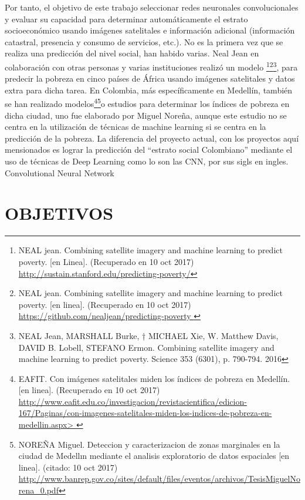     Por tanto, el objetivo de este trabajo seleccionar redes neuronales convolucionales y evaluar su capacidad para determinar automáticamente el estrato socioeconómico usando imágenes satelitales e información adicional (información catastral, presencia y consumo de servicios, etc.). No es la primera vez que se realiza una predicción del nivel social, han habido varias. Neal Jean en colaboración con otras personas y varias instituciones realizó un modelo \footnote{NEAL jean. Combining satellite imagery and machine learning to predict poverty. [en Linea]. (Recuperado en 10 oct 2017) \url{http://sustain.stanford.edu/predicting-poverty/} }\footnote{NEAL jean. Combining satellite imagery and machine learning to predict poverty. [en linea]. (Recuperado en 10 oct 2017) \url{https://github.com/nealjean/predicting-poverty }}\footnote{NEAL Jean, MARSHALL Burke, † MICHAEL Xie, W. Matthew Davis, DAVID B. Lobell, STEFANO Ermon. Combining satellite imagery and machine learning to predict poverty. Science 353 (6301), p. 790-794. 2016},  para predecir la pobreza en cinco países de África usando imágenes satelitales y datos extra para dicha tarea. En Colombia, más específicamente en Medellín, también se han realizado modelos\footnote{EAFIT. Con imágenes satelitales miden los índices de pobreza en Medellín. [en linea]. (Recuperado en 10 oct 2017) \url{http://www.eafit.edu.co/investigacion/revistacientifica/edicion-167/Paginas/con-imagenes-satelitales-miden-los-indices-de-pobreza-en-medellin.aspx> }}\footnote{NOREÑA Miguel. Deteccion y caracterizacion de zonas marginales en la ciudad de Medellın mediante el analisis exploratorio de datos espaciales [en linea]. (citado: 10 oct 2017) \url{http://www.banrep.gov.co/sites/default/files/eventos/archivos/TesisMiguelNorena_0.pdf} }o estudios para determinar los índices de pobreza en dicha ciudad, uno fue elaborado por  Miguel Noreña, aunque este estudio no se centra en la utilización de técnicas de machine learning si  se centra en la predicción de la pobreza. La diferencia del proyecto actual, con los proyectos aquí mensionados es lograr la predicción del “estrato social Colombiano” mediante el uso de técnicas de Deep Learning como lo son las CNN, por sus sigls en ingles. Convolutional Neural Network
    
    
    
    

    \newpage\chapter{OBJETIVOS} 
